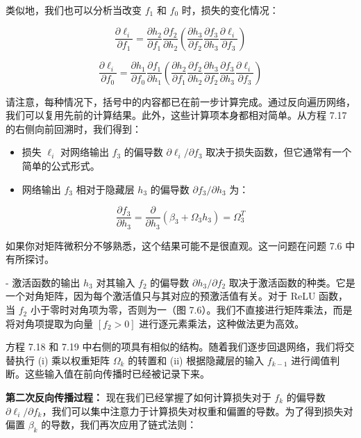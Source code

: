 \documentclass[lang=cn,newtx,10pt,scheme=chinese]{elegantbook}
\begin{document}
类似地，我们也可以分析当改变 \(f_1\) 和 \(f_0\) 时，损失的变化情况：

\begin{equation}
\frac{\partial \ell_i}{\partial f_1} = \frac{\partial h_2}{\partial f_1}  \frac{\partial f_2}{\partial h_2}\left( \frac{\partial h_3}{\partial f_2} \frac{\partial f_3}{\partial h_3} \frac{\partial \ell_i}{\partial f_3} \right) 
\end{equation}


\begin{equation}
\frac{\partial \ell_i}{\partial f_0} = \frac{\partial h_1}{\partial f_0} \frac{\partial f_1}{\partial h_1} \left( \frac{\partial h_2}{\partial f_1} \frac{\partial f_2}{\partial h_2} \frac{\partial h_3}{\partial f_2} \frac{\partial f_3}{\partial h_3} \frac{\partial \ell_i}{\partial f_3} \right) 
\end{equation}

请注意，每种情况下，括号中的内容都已在前一步计算完成。通过反向遍历网络，我们可以复用先前的计算结果。此外，这些计算项本身都相对简单。从方程 7.17 的右侧向前回溯时，我们得到：
\begin{itemize}
    \item 损失 \(\ell_i\) 对网络输出 \(f_3\) 的偏导数 \(\partial \ell_i/\partial f_3\) 取决于损失函数，但它通常有一个简单的公式形式。
    \item 网络输出 \(f_3\) 相对于隐藏层 \(h_3\) 的偏导数 \(\partial f_3/\partial h_3\) 为：
\end{itemize}


\begin{equation}
\frac{\partial f_3}{\partial h_3} = \frac{\partial}{\partial h_3} (\beta_3 + \Omega_3 h_3) = \Omega_3^T  
\end{equation}

如果你对矩阵微积分不够熟悉，这个结果可能不是很直观。这一问题在问题 7.6 中有所探讨。

- 激活函数的输出 \(h_3\) 对其输入 \(f_2\) 的偏导数 \(\partial h_3/\partial f_2\) 取决于激活函数的种类。它是一个对角矩阵，因为每个激活值只与其对应的预激活值有关。对于 ReLU 函数，当 \(f_2\) 小于零时对角项为零，否则为一（图 7.6）。我们不直接进行矩阵乘法，而是将对角项提取为向量 \([f_2 > 0]\) 进行逐元素乘法，这种做法更为高效。

方程 7.18 和 7.19 中右侧的项具有相似的结构。随着我们逐步回退网络，我们将交替执行 (i) 乘以权重矩阵 \(\Omega_k\) 的转置和 (ii) 根据隐藏层的输入 \(f_{k-1}\) 进行阈值判断。这些输入值在前向传播时已经被记录下来。


\textbf{第二次反向传播过程：} 现在我们已经掌握了如何计算损失对于 \(f_k\) 的偏导数 \(\partial \ell_i/\partial f_k\)，我们可以集中注意力于计算损失对权重和偏置的导数。为了得到损失对偏置 \(\beta_k\) 的导数，我们再次应用了链式法则：
\end{document}
